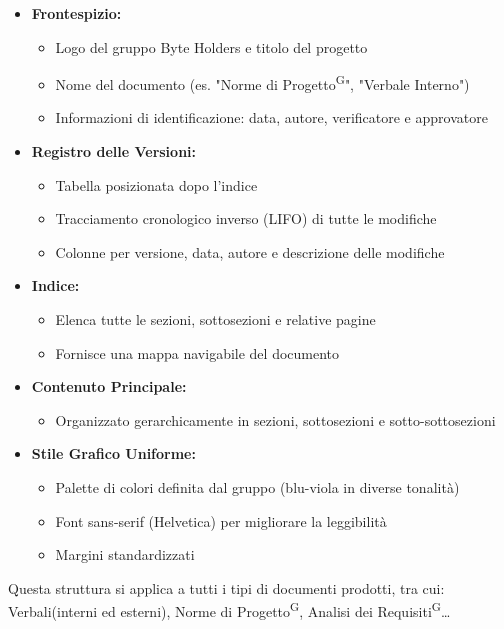 \documentclass[a4paper, 11pt]{article}
\begin{document}
\begin{itemize}[itemsep=6pt]
    \item \textbf{Frontespizio:}
    \begin{itemize}[itemsep=4pt]
        \item Logo del gruppo Byte Holders e titolo del progetto
        \item Nome del documento (es. "Norme di Progetto\textsuperscript{G}", "Verbale Interno")
        \item Informazioni di identificazione: data, autore, verificatore e approvatore
    \end{itemize}
    
    \item \textbf{Registro delle Versioni:}
    \begin{itemize}[itemsep=4pt]
        \item Tabella posizionata dopo l'indice
        \item Tracciamento cronologico inverso (LIFO) di tutte le modifiche
        \item Colonne per versione, data, autore e descrizione delle modifiche
    \end{itemize}
    
    \item \textbf{Indice:}
    \begin{itemize}[itemsep=4pt]
        \item Elenca tutte le sezioni, sottosezioni e relative pagine
        \item Fornisce una mappa navigabile del documento
    \end{itemize}
    
    \item \textbf{Contenuto Principale:}
    \begin{itemize}[itemsep=4pt]
        \item Organizzato gerarchicamente in sezioni, sottosezioni e sotto-sottosezioni
    \end{itemize}

    \item \textbf{Stile Grafico Uniforme:}
    \begin{itemize}[itemsep=4pt]
        \item Palette di colori definita dal gruppo (blu-viola in diverse tonalità)
        \item Font sans-serif (Helvetica) per migliorare la leggibilità
        \item Margini standardizzati
    \end{itemize}
\end{itemize}
Questa struttura si applica a tutti i tipi di documenti prodotti, tra cui: Verbali(interni ed esterni), Norme di Progetto\textsuperscript{G}, Analisi dei Requisiti\textsuperscript{G}\dots
\end{document}
